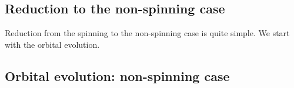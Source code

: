 \documentclass[11pt]{report}
\begin{document}




\subsection{Reduction to the non-spinning case}

Reduction from the spinning to the non-spinning case is quite simple.
We start with the orbital evolution. 

\subsection{Orbital evolution: non-spinning case}
\end{document}
